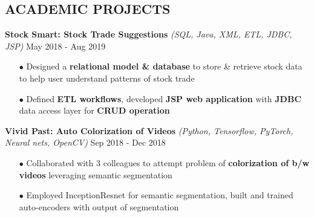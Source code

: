 \documentclass[letterpaper, 10pt, oneside]{article}
\newcommand{\bulltetspace}{\vspace{-0.3em}}
\begin{document}
\begin{center}

\section{\color{headings} \large\textbf{ACADEMIC PROJECTS}}
\vspace{-0.5em}

\color{headings}\textbf{Stock Smart: Stock Trade Suggestions} \textit{(SQL, Java, XML, ETL, JDBC, JSP)} \hfill  May 2018 - Aug 2019
\color{text1}
\vspace{-0.2em}
\begin{itemize}
\bulltetspace
\item[$\bullet$] Designed a \textbf{relational model \& database} to store \& retrieve stock data to help user understand patterns of stock trade \\
\bulltetspace
\item[$\bullet$] Defined \textbf{ETL workflows}, developed \textbf{JSP web application} with \textbf{JDBC} data access layer for \textbf{CRUD operation}
\vspace{-0.4em}
\end{itemize}



\color{headings}\textbf{Vivid Past: Auto Colorization of Videos} \textit{(Python, Tensorflow, PyTorch, Neural nets, OpenCV)} \hfill Sep 2018 - Dec 2018
\color{text1}
\vspace{-0.2em}
\begin{itemize}
\bulltetspace
\item[$\bullet$] Collaborated with 3 colleagues to attempt problem of \textbf{colorization of b/w videos} leveraging semantic segmentation\\
\bulltetspace
\item[$\bullet$]  Employed InceptionResnet for semantic segmentation, built and trained auto-encoders with output of segmentation 
\vspace{-0.4em}
\end{itemize}





\end{center}
\end{document}
